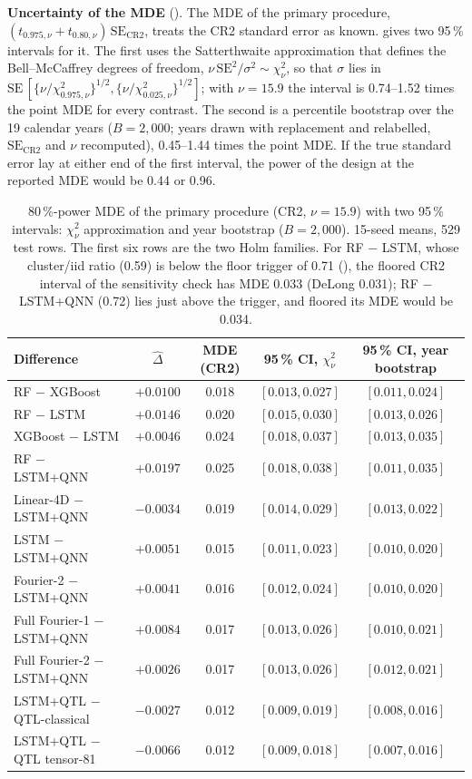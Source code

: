 \documentclass[11pt,a4paper]{article}
\begin{document}
\textbf{Uncertainty of the MDE} (). The MDE of the primary procedure, $(t_{0.975,\nu}+t_{0.80,\nu})\,\text{SE}_{\text{CR2}}$, treats the CR2 standard error as known.  gives two 95\,\% intervals for it. The first uses the Satterthwaite approximation that defines the Bell--McCaffrey degrees of freedom, $\nu\,\text{SE}^2/\sigma^2\sim\chi^2_\nu$, so that $\sigma$ lies in $\text{SE}\,[\{\nu/\chi^2_{0.975,\nu}\}^{1/2},\{\nu/\chi^2_{0.025,\nu}\}^{1/2}]$; with $\nu=15.9$ the interval is 0.74--1.52 times the point MDE for every contrast. The second is a percentile bootstrap over the 19 calendar years ($B=2{,}000$; years drawn with replacement and relabelled, $\text{SE}_{\text{CR2}}$ and $\nu$ recomputed), 0.45--1.44 times the point MDE. If the true standard error lay at either end of the first interval, the power of the design at the reported MDE would be 0.44 or 0.96.

\begin{table}[htbp]
\centering
\caption{80\,\%-power MDE of the primary procedure (CR2, $\nu=15.9$) with two 95\,\% intervals: $\chi^2_\nu$ approximation and year bootstrap ($B=2{,}000$). 15-seed means, 529 test rows. The first six rows are the two Holm families. For RF $-$ LSTM, whose cluster/iid ratio (0.59) is below the floor trigger of 0.71 (), the floored CR2 interval of the sensitivity check has MDE 0.033 (DeLong 0.031); RF $-$ LSTM+QNN (0.72) lies just above the trigger, and floored its MDE would be 0.034.}
\label{tab:mde_ci}
{\small
\begin{tabular}{lcccc}
\toprule
\textbf{Difference} & $\hat\Delta$ & \textbf{MDE (CR2)} & \textbf{95\,\% CI, $\chi^2_\nu$} & \textbf{95\,\% CI, year bootstrap} \\
\midrule
RF $-$ XGBoost & $+0.0100$ & 0.018 & $[0.013,0.027]$ & $[0.011,0.024]$ \\
RF $-$ LSTM & $+0.0146$ & 0.020 & $[0.015,0.030]$ & $[0.013,0.026]$ \\
XGBoost $-$ LSTM & $+0.0046$ & 0.024 & $[0.018,0.037]$ & $[0.013,0.035]$ \\
RF $-$ LSTM+QNN & $+0.0197$ & 0.025 & $[0.018,0.038]$ & $[0.011,0.035]$ \\
Linear-4D $-$ LSTM+QNN & $-0.0034$ & 0.019 & $[0.014,0.029]$ & $[0.013,0.022]$ \\
LSTM $-$ LSTM+QNN & $+0.0051$ & 0.015 & $[0.011,0.023]$ & $[0.010,0.020]$ \\
\midrule
Fourier-2 $-$ LSTM+QNN & $+0.0041$ & 0.016 & $[0.012,0.024]$ & $[0.010,0.020]$ \\
Full Fourier-1 $-$ LSTM+QNN & $+0.0084$ & 0.017 & $[0.013,0.026]$ & $[0.010,0.021]$ \\
Full Fourier-2 $-$ LSTM+QNN & $+0.0026$ & 0.017 & $[0.013,0.026]$ & $[0.012,0.021]$ \\
LSTM+QTL $-$ QTL-classical & $-0.0027$ & 0.012 & $[0.009,0.019]$ & $[0.008,0.016]$ \\
LSTM+QTL $-$ QTL tensor-81 & $-0.0066$ & 0.012 & $[0.009,0.018]$ & $[0.007,0.016]$ \\
\bottomrule
\end{tabular}}
\end{table}
\end{document}
